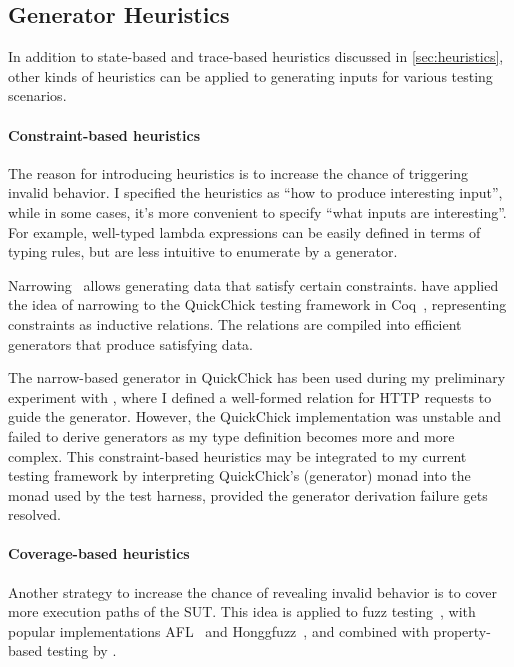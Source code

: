 \subsection{Generator Heuristics}
\label{sec:related-gen}

In addition to state-based and trace-based heuristics discussed in
\autoref{sec:heuristics}, other kinds of heuristics can be applied to generating
inputs for various testing scenarios.

\paragraph{Constraint-based heuristics}
The reason for introducing heuristics is to increase the chance of triggering
invalid behavior.  I specified the heuristics as ``how to produce interesting
input'', while in some cases, it's more convenient to specify ``what inputs are
interesting''.  For example, well-typed lambda expressions can be easily defined
in terms of typing rules, but are less intuitive to enumerate by a generator.

Narrowing~\cite{narrowing} allows generating data that satisfy certain
constraints.  \citet{gengood} have applied the idea of narrowing to the
QuickChick testing framework in Coq~\cite{quickchick}, representing constraints
as inductive relations.  The relations are compiled into efficient generators
that produce satisfying data.

The narrow-based generator in QuickChick has been used during my preliminary
experiment with \http, where I defined a well-formed relation for HTTP requests
to guide the generator.  However, the QuickChick implementation was unstable and
failed to derive generators as my type definition becomes more and more complex.
This constraint-based heuristics may be integrated to my current testing
framework by interpreting QuickChick's  (generator) monad into
the  monad used by the test harness, provided the generator derivation
failure gets resolved.

\paragraph{Coverage-based heuristics}
Another strategy to increase the chance of revealing invalid behavior is to
cover more execution paths of the SUT.  This idea is applied to fuzz
testing~\cite{fuzz}, with popular implementations AFL~\cite{afl} and
Honggfuzz~\cite{honggfuzz}, and combined with property-based testing by
\citet{fuzzchick}.

